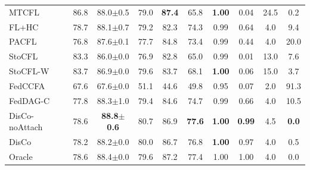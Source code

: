 \begin{tabular}{lccccccccc}
MTCFL & 86.8 & 88.0$\pm$0.5 & 79.0 & \textbf{87.4} & 65.8 & \textbf{1.00} & 0.04 & 24.5 & 0.2 \\
FL+HC & 78.7 & 88.1$\pm$0.7 & 79.2 & 82.3 & 74.3 & 0.99 & 0.64 & 4.0 & 9.4 \\
PACFL & 76.8 & 87.6$\pm$0.1 & 77.7 & 84.8 & 73.4 & 0.99 & 0.44 & 4.0 & 20.0 \\
StoCFL & 83.3 & 86.0$\pm$0.0 & 76.9 & 82.8 & 65.0 & 0.99 & 0.01 & 13.0 & 7.6 \\
StoCFL-W & 83.7 & 86.9$\pm$0.0 & 79.6 & 83.7 & 68.1 & \textbf{1.00} & 0.06 & 15.0 & 3.7 \\
FedCCFA & 67.6 & 67.6$\pm$0.0 & 51.1 & 44.6 & 49.8 & 0.95 & 0.07 & 2.0 & 91.3 \\
FedDAG-C & 77.8 & 88.3$\pm$1.0 & 79.4 & 84.6 & 74.7 & 0.99 & 0.66 & 4.0 & 10.5 \\
DisCo-noAttach & 78.6 & \textbf{88.8$\pm$0.6} & 80.7 & 86.9 & \textbf{77.6} & \textbf{1.00} & \textbf{0.99} & 4.5 & \textbf{0.0} \\
DisCo & 78.2 & 88.2$\pm$0.0 & 80.0 & 86.7 & 76.8 & \textbf{1.00} & 0.97 & 4.0 & 0.5 \\
Oracle & 78.6 & 88.4$\pm$0.0 & 79.6 & 87.2 & 77.4 & 1.00 & 1.00 & 4.0 & 0.0 \\
\bottomrule
\end{tabular}
